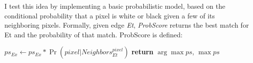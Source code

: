\documentclass[letterpaper]{article}
\begin{document}
I test this idea by implementing a basic probabilistic model, based on the conditional probability that a pixel is white or black given a few of its neighboring pixels. Formally, given edge \emph{Et}, \emph{ProbScore} returns the best match for Et and the probability of that match. ProbScore is defined:
\begin{algorithmic}
   
      \State $ps_{Ex} \gets ps_{Ex} * \Pr(pixel|Neighbors_{Et}^{pixel})$ 
    \EndFor
  \EndFor
   
  \State \textbf{return} $\arg\max ps$, $\max ps$
\EndProcedure
\end{algorithmic}
\end{document}
